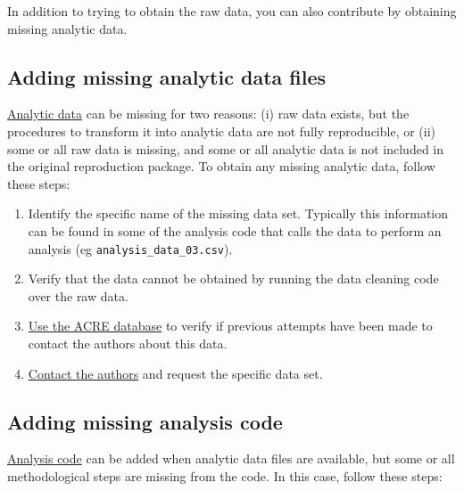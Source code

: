 \documentclass[]{book}
\providecommand{\tightlist}{%
  \setlength{\itemsep}{0pt}\setlength{\parskip}{0pt}}
\begin{document}
In addition to trying to obtain the raw data, you can also contribute by obtaining missing analytic data.

\hypertarget{ad}{%
\subsection{Adding missing analytic data files}\label{ad}}

\protect\hyperlink{describe-inputs}{Analytic data} can be missing for two reasons: (i) raw data exists, but the procedures to transform it into analytic data are not fully reproducible, or (ii) some or all raw data is missing, and some or all analytic data is not included in the original reproduction package. To obtain any missing analytic data, follow these steps:

\begin{enumerate}
\def\labelenumi{\arabic{enumi}.}
\tightlist
\item
  Identify the specific name of the missing data set. Typically this information can be found in some of the analysis code that calls the data to perform an analysis (eg \texttt{analysis\_data\_03.csv}).\\
\item
  Verify that the data cannot be obtained by running the data cleaning code over the raw data.\\
\item
  \href{ADD\%20LINK}{Use the ACRE database} to verify if previous attempts have been made to contact the authors about this data.\\
\item
  \protect\hyperlink{tips-for-communication}{Contact the authors} and request the specific data set.
\end{enumerate}

\hypertarget{ac}{%
\subsection{Adding missing analysis code}\label{ac}}

\protect\hyperlink{describe-inputs}{Analysis code} can be added when analytic data files are available, but some or all methodological steps are missing from the code. In this case, follow these steps:
\end{document}
